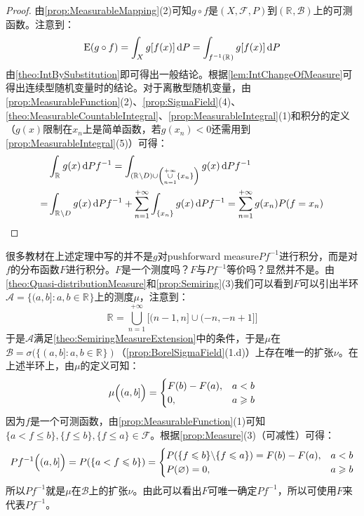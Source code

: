 \begin{proof}
	由\cref{prop:MeasurableMapping}(2)可知$g\circ f$是$(X,\mathscr{F},P)$到$(\mathbb{R}^{},\mathcal{B})$上的可测函数。注意到：
	\begin{equation*}
		\operatorname{E}(g\circ f)=\int_{X}g[f(x)]\mathop{}\!\mathrm{d} P=\int_{f^{-1}(\mathbb{R}^{})}g[f(x)]\mathop{}\!\mathrm{d} P
	\end{equation*}
	由\cref{theo:IntBySubstitution}即可得出一般结论。根据\cref{lem:IntChangeOfMeasure}可得出连续型随机变量时的结论。对于离散型随机变量，由\cref{prop:MeasurableFunction}(2)、\cref{prop:SigmaField}(4)、\cref{theo:MeasurableCountableIntegral}、\cref{prop:MeasurableIntegral}(1)和积分的定义（$g(x)$限制在$x_n$上是简单函数，若$g(x_n)<0$还需用到\cref{prop:MeasurableIntegral}(5)）可得：
	\begin{align*}
		&\int_{\mathbb{R}^{}}g(x)\mathop{}\!\mathrm{d} Pf^{-1}=\int_{(\mathbb{R}^{}\backslash D)\cup\left(\underset{n=1}{\overset{+\infty}{\cup}}\{x_n\}\right)}g(x)\mathop{}\!\mathrm{d} Pf^{-1} \\
		=&\int_{\mathbb{R}^{}\backslash D}g(x)\mathop{}\!\mathrm{d} Pf^{-1}+\sum_{n=1}^{+\infty}\int_{\{x_n\}}g(x)\mathop{}\!\mathrm{d} Pf^{-1}=\sum_{n=1}^{+\infty}g(x_n)P(f=x_n)\qedhere
	\end{align*}
\end{proof}
\begin{note}
	很多教材在上述定理中写的并不是$g$对pushforward measure$Pf^{-1}$进行积分，而是对$f$的分布函数$F$进行积分。$F$是一个测度吗？$F$与$Pf^{-1}$等价吗？显然并不是。由\cref{theo:Quasi-distributionMeasure}和\cref{prop:Semiring}(3)我们可以看到$F$可以引出半环$\mathscr{A}=\{(a,b]:a,b\in\mathbb{R}^{}\}$上的测度$\mu$，注意到：
	\begin{equation*}
		\mathbb{R}^{}=\underset{n=1}{\overset{+\infty}{\bigcup}}\Big[(n-1,n]\cup(-n,-n+1]\Big]
	\end{equation*}
	于是$\mathscr{A}$满足\cref{theo:SemiringMeasureExtension}中的条件，于是$\mu$在$\mathcal{B}=\sigma(\{(a,b]:a,b\in\mathbb{R}^{}\})$（\cref{prop:BorelSigmaField}(1.d)）上存在唯一的扩张$\nu$。在上述半环上，由$\mu$的定义可知：
	\begin{equation*}
		\mu\Bigl((a,b]\Bigr)=
		\begin{cases}
			F(b)-F(a),&a<b \\
			0,&a\geqslant b
		\end{cases}
	\end{equation*}
	因为$f$是一个可测函数，由\cref{prop:MeasurableFunction}(1)可知$\{a<f\leqslant b\},\{f\leqslant b\},\{f\leqslant a\}\in\mathscr{F}$。根据\cref{prop:Measure}(3)（可减性）可得：
	\begin{equation*}
		Pf^{-1}\Bigl((a,b]\Bigr)=P(\{a<f\leqslant b\})=
		\begin{cases}
			P(\{f\leqslant b\}\backslash\{f\leqslant a\})=F(b)-F(a),&a<b \\
			P(\varnothing)=0,&a\geqslant b
		\end{cases}
	\end{equation*}
	所以$Pf^{-1}$就是$\mu$在$\mathcal{B}$上的扩张$\nu$。由此可以看出$F$可唯一确定$Pf^{-1}$，所以可使用$F$来代表$Pf^{-1}$。
\end{note}

